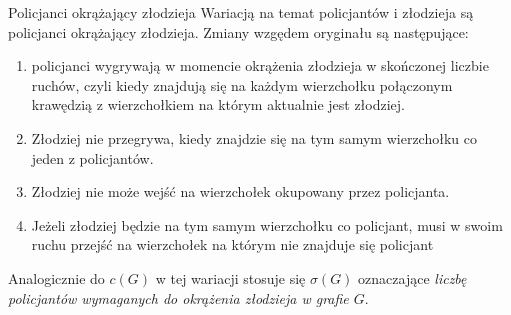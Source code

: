 \documentclass[polish]{beamer}
\begin{document}
\begin{frame}{Policjanci okrążający złodzieja}
    Wariacją na temat policjantów i złodzieja są policjanci okrążający złodzieja.\cite{c_s_r}
    Zmiany wzgędem oryginału są następujące:
    \pause
    \begin{enumerate}[<+->]
        \item policjanci wygrywają w momencie okrążenia złodzieja w skończonej liczbie ruchów, 
        czyli kiedy znajdują się na każdym wierzchołku połączonym krawędzią z wierzchołkiem na którym aktualnie jest złodziej.
        \item Złodziej nie przegrywa, kiedy znajdzie się na tym samym wierzchołku co jeden z policjantów.
        \item Złodziej nie może wejść na wierzchołek okupowany przez policjanta.
        \item Jeżeli złodziej będzie na tym samym wierzchołku co policjant, 
        musi w swoim ruchu przejść na wierzchołek na którym nie znajduje się policjant
    \end{enumerate}
    \pause
    Analogicznie do $c\left(G\right)$ w tej wariacji stosuje się $\sigma\left(G\right)$ oznaczające \textit{liczbę policjantów wymaganych do okrążenia złodzieja w grafie $G$}.
\end{frame}

\end{document}
